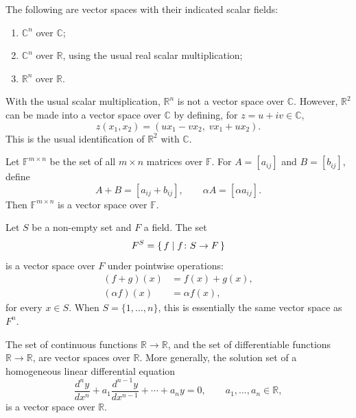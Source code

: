 \begin{Example}
The following are vector spaces with their indicated scalar fields:
\begin{enumerate}
\item $\mathbb C^n$ over $\mathbb C$;
\item $\mathbb C^n$ over $\mathbb R$, using the usual real scalar multiplication;
\item $\mathbb R^n$ over $\mathbb R$.
\end{enumerate}
With the usual scalar multiplication, $\mathbb R^n$ is not a vector space over $\mathbb C$. However, $\mathbb R^2$ can be made into a vector space over $\mathbb C$ by defining, for $z=u+iv\in\mathbb C$,
\begin{equation*}
z(x_1,x_2)=(ux_1-vx_2,\;vx_1+ux_2).
\end{equation*}
This is the usual identification of $\mathbb R^2$ with $\mathbb C$.
\end{Example}

\begin{Example}\label{ex:MatrixSpace}
Let $\mathbb F^{m\times n}$ be the set of all $m\times n$ matrices over $\mathbb F$. For $A=[a_{ij}]$ and $B=[b_{ij}]$, define
\begin{equation*}
A+B=[a_{ij}+b_{ij}],\qquad \alpha A=[\alpha a_{ij}].
\end{equation*}
Then $\mathbb F^{m\times n}$ is a vector space over $\mathbb F$.
\end{Example}

\begin{Example}\label{ex:FunctionSpace}
Let $S$ be a non-empty set and $F$ a field. The set
\begin{equation*}
F^S=\qty{\, f \mid f\colon S\to F \,}
\end{equation*}
is a vector space over $F$ under pointwise operations:
\begin{align*}
(f+g)(x)&=f(x)+g(x),\\
(\alpha f)(x)&=\alpha f(x),
\end{align*}
for every $x\in S$. When $S=\{1,\ldots,n\}$, this is essentially the same vector space as $F^n$.
\end{Example}

\begin{Example}
The set of continuous functions $\mathbb R\to\mathbb R$, and the set of differentiable functions $\mathbb R\to\mathbb R$, are vector spaces over $\mathbb R$. More generally, the solution set of a homogeneous linear differential equation
\begin{equation*}
\frac{d^ny}{dx^n}+a_1\frac{d^{n-1}y}{dx^{n-1}}+\cdots+a_ny=0,
\qquad a_1,\ldots,a_n\in\mathbb R,
\end{equation*}
is a vector space over $\mathbb R$.
\end{Example}

